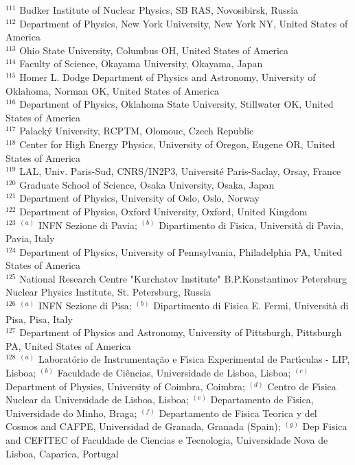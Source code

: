 \begin{flushleft}
$^{111}$ Budker Institute of Nuclear Physics, SB RAS, Novosibirsk, Russia\\
$^{112}$ Department of Physics, New York University, New York NY, United States of America\\
$^{113}$ Ohio State University, Columbus OH, United States of America\\
$^{114}$ Faculty of Science, Okayama University, Okayama, Japan\\
$^{115}$ Homer L. Dodge Department of Physics and Astronomy, University of Oklahoma, Norman OK, United States of America\\
$^{116}$ Department of Physics, Oklahoma State University, Stillwater OK, United States of America\\
$^{117}$ Palack{\'y} University, RCPTM, Olomouc, Czech Republic\\
$^{118}$ Center for High Energy Physics, University of Oregon, Eugene OR, United States of America\\
$^{119}$ LAL, Univ. Paris-Sud, CNRS/IN2P3, Universit{\'e} Paris-Saclay, Orsay, France\\
$^{120}$ Graduate School of Science, Osaka University, Osaka, Japan\\
$^{121}$ Department of Physics, University of Oslo, Oslo, Norway\\
$^{122}$ Department of Physics, Oxford University, Oxford, United Kingdom\\
$^{123}$ $^{(a)}$ INFN Sezione di Pavia; $^{(b)}$ Dipartimento di Fisica, Universit{\`a} di Pavia, Pavia, Italy\\
$^{124}$ Department of Physics, University of Pennsylvania, Philadelphia PA, United States of America\\
$^{125}$ National Research Centre "Kurchatov Institute" B.P.Konstantinov Petersburg Nuclear Physics Institute, St. Petersburg, Russia\\
$^{126}$ $^{(a)}$ INFN Sezione di Pisa; $^{(b)}$ Dipartimento di Fisica E. Fermi, Universit{\`a} di Pisa, Pisa, Italy\\
$^{127}$ Department of Physics and Astronomy, University of Pittsburgh, Pittsburgh PA, United States of America\\
$^{128}$ $^{(a)}$ Laborat{\'o}rio de Instrumenta{\c{c}}{\~a}o e F{\'\i}sica Experimental de Part{\'\i}culas - LIP, Lisboa; $^{(b)}$ Faculdade de Ci{\^e}ncias, Universidade de Lisboa, Lisboa; $^{(c)}$ Department of Physics, University of Coimbra, Coimbra; $^{(d)}$ Centro de F{\'\i}sica Nuclear da Universidade de Lisboa, Lisboa; $^{(e)}$ Departamento de Fisica, Universidade do Minho, Braga; $^{(f)}$ Departamento de Fisica Teorica y del Cosmos and CAFPE, Universidad de Granada, Granada (Spain); $^{(g)}$ Dep Fisica and CEFITEC of Faculdade de Ciencias e Tecnologia, Universidade Nova de Lisboa, Caparica, Portugal\\

\end{flushleft}
